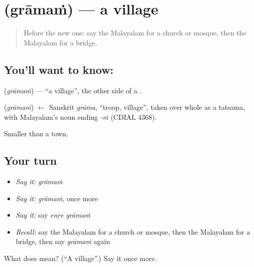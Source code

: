 \section[\texorpdfstring{\ml{ഗ്രാമം} (grāmaṁ)}{ഗ്രാമം (grāmaṁ)}]{ (grāmaṁ) — a village}

\label{lesson:ML-C135-village}



\begin{quote}
Before the new one: say the Malayalam for a church or mosque, then the Malayalam for a bridge.
\end{quote}

\subsection*{You'll want to know: }
\textbf{} (\emph{grāmaṁ}) — \textquotedblleft{}a village\textquotedblright{}, the other side of a \textbf{}.

\begin{cousinweb}
\textbf{} (\emph{grāmaṁ}) $\leftarrow$ Sanskrit \emph{grāma}, \textquotedblleft{}troop, village\textquotedblright{}, taken over whole as a tatsama, with Malayalam's noun ending \emph{-ṁ} (CDIAL 4368).
\end{cousinweb}

\begin{grammarlens}[title={What you've built}]
Smaller than a town.
\end{grammarlens}

\subsection*{Your turn}
\begin{itemize}
\raggedright
  \item \emph{Say it:} \emph{grāmaṁ}
  \item \emph{Say it:} \emph{grāmaṁ}, once more
  \item \emph{Say it:} say \emph{enṟe grāmaṁ}
  \item \emph{Recall:} say the Malayalam for a church or mosque, then the Malayalam for a bridge, then say \emph{grāmaṁ} again
\end{itemize}

\begin{tcolorbox}[breakable,colback=teal!4,colframe=teal!35!black,title={Before you move on}]
What does  mean? (\textquotedblleft{}A village\textquotedblright{}.) Say it once more.
\end{tcolorbox}
